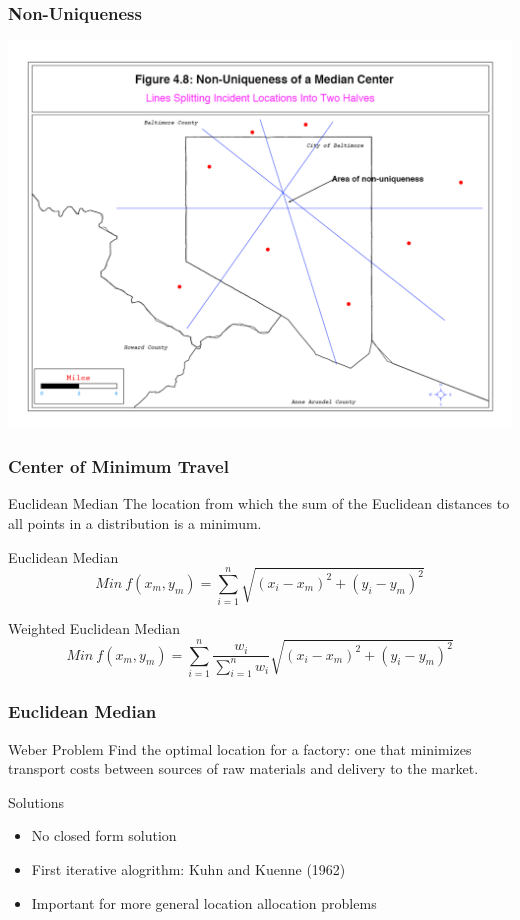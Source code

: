 \documentclass[nototal]{beamer}
\begin{document}
\begin{frame}
   \frametitle{Non-Uniqueness}
   \begin{center}
     \includegraphics[width=.85\linewidth]{mediancenter1}
   \end{center}
 \end{frame}


  \begin{frame}
    \frametitle{Center of Minimum Travel}
    \begin{block}{Euclidean Median}
      The location from which the sum of the Euclidean distances to all points in a
      distribution is a minimum.
     \end{block}
     \begin{block}{Euclidean Median}
     \begin{equation}
       Min\ f(x_m,y_m)= \sum_{i=1}^n \sqrt{(x_i - x_m)^2 + (y_i - y_m)^2}
      \end{equation}
    \end{block}
      \begin{block}{Weighted Euclidean Median}
     \begin{equation}
       Min\ f(x_m,y_m)= \sum_{i=1}^n\frac{w_i}{\sum_{i=1}^n w_i}
 \sqrt{(x_i - x_m)^2 + (y_i - y_m)^2}
      \end{equation}
    \end{block}

   \end{frame}

   \begin{frame}
     \frametitle{Euclidean Median}
     \begin{block}{Weber Problem}
        Find the optimal location for a factory: one that minimizes transport
	costs between sources of raw materials and delivery to the market.
      \end{block}
     \begin{block}{Solutions}
       \begin{itemize}
	 \item No closed form solution
	 \item First iterative alogrithm: Kuhn and Kuenne (1962)
	 \item Important for more general location allocation problems
       \end{itemize}

     \end{block}
    \end{frame}
\end{document}
